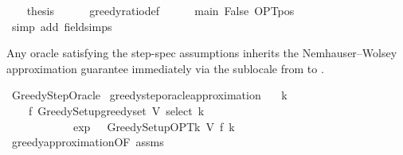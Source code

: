 \begin{isabellebody}
\isanewline
\ \ \isamarkupfalse%
\ {\isacharquery}{\kern0pt}thesis\isanewline
\ \ \ \ \isamarkupfalse%
\ greedy{\isacharunderscore}{\kern0pt}ratio{\isacharunderscore}{\kern0pt}def\isanewline
\ \ \ \ \isamarkupfalse%
\ main\ False\ OPT{\isacharunderscore}{\kern0pt}pos\isanewline
\ \ \ \ \isamarkupfalse%
\ {\isacharparenleft}{\kern0pt}simp\ add{\isacharcolon}{\kern0pt}\ field{\isacharunderscore}{\kern0pt}simps{\isacharparenright}{\kern0pt}\isanewline
{}\isamarkupfalse%
%
\endisatagproof
{\isafoldproof}%
%
\isadelimproof
\isanewline
%
\endisadelimproof
\isanewline
{}\isamarkupfalse%
%
\isadelimdocument
%
\endisadelimdocument
%
\isatagdocument
%
\isamarkuptrue%
%
\endisatagdocument
{\isafolddocument}%
%
\isadelimdocument
%
\endisadelimdocument
%
\begin{isamarkuptext}%
Any oracle satisfying the step-spec assumptions inherits the
  Nemhauser--Wolsey approximation guarantee immediately via the
  sublocale from  to .%
\end{isamarkuptext}\isamarkuptrue%
\isamarkupfalse%
\ Greedy{\isacharunderscore}{\kern0pt}Step{\isacharunderscore}{\kern0pt}Oracle\isanewline
{}\isanewline
\isanewline
{}\isamarkupfalse%
\ greedy{\isacharunderscore}{\kern0pt}step{\isacharunderscore}{\kern0pt}oracle{\isacharunderscore}{\kern0pt}approximation{\isacharcolon}{\kern0pt}\isanewline
\ \ \ {\isachardoublequoteopen}k\ {\isachargreater}{\kern0pt}\ {}{\isachardoublequoteclose}\isanewline
\ \ \isanewline
\ \ \ \ {\isachardoublequoteopen}f\ {\isacharparenleft}{\kern0pt}Greedy{\isacharunderscore}{\kern0pt}Setup{\isachardot}{\kern0pt}greedy{\isacharunderscore}{\kern0pt}set\ V\ select\ k{\isacharparenright}{\kern0pt}\isanewline
\ \ \ \ \ \ \ {\isasymge}\ {\isacharparenleft}{\kern0pt}{}\ {\isacharminus}{\kern0pt}\ {}\ {\isacharslash}{\kern0pt}\ exp\ {}{\isacharparenright}{\kern0pt}\ {\isacharasterisk}{\kern0pt}\ Greedy{\isacharunderscore}{\kern0pt}Setup{\isachardot}{\kern0pt}OPT{\isacharunderscore}{\kern0pt}k\ V\ f\ k{\isachardoublequoteclose}\isanewline
%
\isadelimproof
\ \ %
\endisadelimproof
%
\isatagproof
{}\isamarkupfalse%
\ greedy{\isacharunderscore}{\kern0pt}approximation{\isacharbrackleft}{\kern0pt}OF\ assms{\isacharbrackright}{\kern0pt}\ \isakeywordONE{{\isachardot}{\kern0pt}}\isamarkupfalse%
%
\endisatagproof
{\isafoldproof}%
%
\isadelimproof
\isanewline
%
\endisadelimproof
\isanewline
{}\isamarkupfalse%
\isanewline
%
\isadelimtheory
\isanewline
%
\endisadelimtheory
%
\isatagtheory
{}\isamarkupfalse%
%
\endisatagtheory
{\isafoldtheory}%
%
\isadelimtheory
%
\endisadelimtheory
%
\end{isabellebody}%
